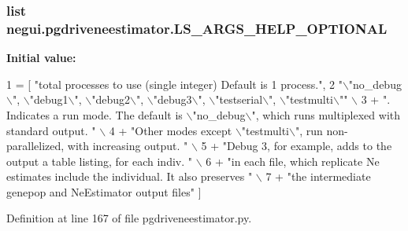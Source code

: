 \subsubsection[{\texorpdfstring{L\+S\+\_\+\+A\+R\+G\+S\+\_\+\+H\+E\+L\+P\+\_\+\+O\+P\+T\+I\+O\+N\+AL}{LS_ARGS_HELP_OPTIONAL}}]{\setlength{\rightskip}{0pt plus 5cm}list negui.\+pgdriveneestimator.\+L\+S\+\_\+\+A\+R\+G\+S\+\_\+\+H\+E\+L\+P\+\_\+\+O\+P\+T\+I\+O\+N\+AL}\hypertarget{namespacenegui_1_1pgdriveneestimator_aee59027c12769e0749f07a70867259b4}{}\label{namespacenegui_1_1pgdriveneestimator_aee59027c12769e0749f07a70867259b4}
{\bfseries Initial value\+:}
\begin{DoxyCode}
1 = [ \textcolor{stringliteral}{"total processes to use (single integer) Default is 1 process."},
2                 \textcolor{stringliteral}{"\(\backslash\)"no\_debug\(\backslash\)", \(\backslash\)"debug1\(\backslash\)", \(\backslash\)"debug2\(\backslash\)", \(\backslash\)"debug3\(\backslash\)", \(\backslash\)"testserial\(\backslash\)", \(\backslash\)"testmulti\(\backslash\)""} \(\backslash\)
3                 + \textcolor{stringliteral}{".  Indicates a run mode. The default is \(\backslash\)"no\_debug\(\backslash\)", which runs multiplexed with
       standard output.  "} \(\backslash\)
4                 + \textcolor{stringliteral}{"Other modes except \(\backslash\)"testmulti\(\backslash\)", run non-parallelized, with increasing output.  "} \(\backslash\)
5                 + \textcolor{stringliteral}{"Debug 3, for example, adds to the output a table listing, for each indiv. "} \(\backslash\)
6                 + \textcolor{stringliteral}{"in each file, which replicate Ne estimates include the individual.  It also preserves "} 
      \(\backslash\)
7                 + \textcolor{stringliteral}{"the intermediate genepop and NeEstimator output files"} ]
\end{DoxyCode}


Definition at line 167 of file pgdriveneestimator.\+py.

